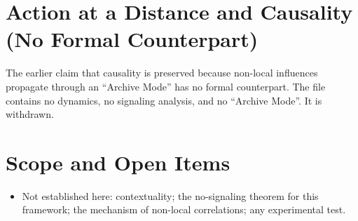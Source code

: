 \documentclass[11pt, a4paper]{article}
\begin{document}
\section{Action at a Distance and Causality (No Formal Counterpart)}
The earlier claim that causality is preserved because non-local influences propagate through an ``Archive Mode'' has no formal counterpart. The file contains no dynamics, no signaling analysis, and no ``Archive Mode''. It is withdrawn.

\section{Scope and Open Items}
\begin{itemize}
  \item Not established here: contextuality; the no-signaling theorem for this framework; the mechanism of non-local correlations; any experimental test.
\end{itemize}
\end{document}
